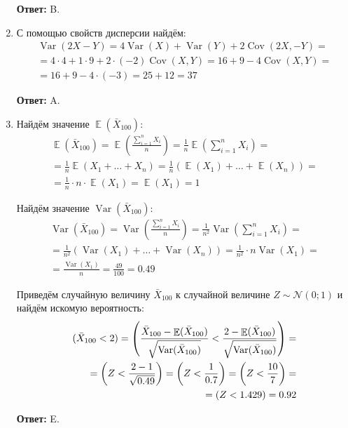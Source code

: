 \documentclass[a4paper]{article} %
\DeclareMathOperator{\Var}{Var}
\DeclareMathOperator{\Cov}{Cov}
\DeclareMathOperator{\E}{\mathbb{E}}
\let\P\relax
\DeclareMathOperator{\P}{\mathbb{P}}
\begin{document}
\begin{enumerate}
    \textbf{Ответ:} B.
    
    
    \item
    С помощью свойств дисперсии найдём:
    \begin{align*}
    \Var(2X - Y) = 4\Var(X) + \Var(Y) + 2\Cov(2X, -Y) = \\
    = 4 \cdot 4 + 1 \cdot 9 + 2 \cdot (-2)\Cov(X, Y) = 16 + 9 - 4\Cov(X, Y) = \\
    = 16 + 9 - 4 \cdot (-3) = 25 +12 = 37
    \end{align*}
    
    
    \textbf{Ответ:} A.
    
    
    \item
    Найдём значение $\E(\bar{X}_{100})$:
    \begin{align*}
    \E(\bar{X}_{100}) = \E\left(\frac{\sum_{i = 1}^{n} X_{i}}{n} \right)  = \frac{1}{n} \E\left(\sum_{i = 1}^{n} X_{i} \right) = \\
    = \frac{1}{n} \E(X_{1} + \ldots + X_{n}) = \frac{1}{n} ( \E(X_{1}) + \ldots + \E(X_{n}))  = \\
    = \frac{1}{n} \cdot n  \cdot \E(X_{1}) = \E(X_{1}) = 1
    \end{align*}
    
    Найдём значение $\Var(\bar{X}_{100})$:
    \begin{align*}
    \Var(\bar{X}_{100}) = \Var\left(\frac{\sum_{i = 1}^{n} X_{i}}{n} \right) = \frac{1}{n^{2}} \Var\left(\sum_{i = 1}^{n} X_{i} \right) = \\
    =  \frac{1}{n^{2}} (\Var(X_{1}) + \ldots + \Var(X_{n})) = \frac{1}{n^{2}} \cdot n\Var(X_{1}) = \\
    = \frac{\Var(X_{1})}{n} = \frac{49}{100} = 0.49
    \end{align*}
    
    Приведём случайную величину $\bar{X}_{100}$ к случайной величине $Z \sim \mathcal{N}(0; 1)$ и найдём искомую вероятность:
    \begin{align*}
    	\P(\bar{X}_{100} < 2) = \P\left(\frac{\bar{X}_{100} - \E(\bar{X}_{100})}{\sqrt{\Var(\bar{X}_{100})}} < \frac{2 - \E(\bar{X}_{100})}{\sqrt{\Var(\bar{X}_{100})}} \right) = \\
    	= \P\left(Z < \frac{2-1}{\sqrt{0.49}} \right) = \P\left(Z < \frac{1}{0.7} \right) = \P\left(Z < \frac{10}{7} \right) = \\
    	= \P(Z < 1.429) = 0.92
    \end{align*}
    
    \textbf{Ответ:} E.
    
    
\end{enumerate}
\end{document}
